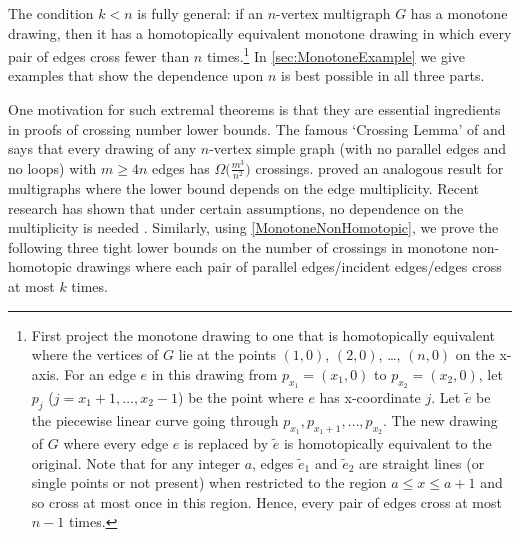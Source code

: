 \documentclass[a4paper,11pt]{article}
\renewcommand{\geq}{\geqslant}
\renewcommand{\leq}{\leqslant}
\begin{document}
The condition $k < n$ is fully general: if an $n$-vertex multigraph $G$ has a monotone drawing, then it has a homotopically equivalent monotone drawing in which every pair of edges cross fewer than $n$ times.\footnote{First project the monotone drawing to one that is homotopically equivalent where the vertices of $G$ lie at the points $(1, 0)$, $(2, 0)$, \ldots, $(n, 0)$ on the x-axis. For an edge $e$ in this drawing from $p_{x_1} = (x_1, 0)$ to $p_{x_2} = (x_2, 0)$, let $p_j$ ($j = x_1 + 1, \dotsc, x_2 - 1$) be the point where $e$ has x-coordinate $j$. Let $\tilde{e}$ be the piecewise linear curve going through $p_{x_1}, p_{x_1 + 1}, \dotsc, p_{x_2}$. The new drawing of $G$ where every edge $e$ is replaced by $\tilde{e}$ is homotopically equivalent to the original. Note that for any integer $a$, edges $\tilde{e}_1$ and $\tilde{e}_2$ are straight lines (or single points or not present) when restricted to the region $a \leq x \leq a + 1$ and so cross at most once in this region. Hence, every pair of edges cross at most $n - 1$ times.} In \cref{sec:MonotoneExample} we give examples that show the dependence upon $n$ is best possible in all three parts.

One motivation for such extremal theorems is that they are essential ingredients in proofs of crossing number lower bounds. The famous `Crossing Lemma' of \citet*{Ajtai82} and \citet{Leighton83} says that every drawing of any $n$-vertex simple graph (with no parallel edges and no loops) with $m \geq 4n$ edges has $\Omega\bigl(\frac{m^3}{n^2}\bigr)$ crossings.  proved an analogous result for multigraphs where the lower bound depends on the edge multiplicity. Recent research has shown that under certain assumptions, no dependence on the multiplicity is needed \citep{KPTU21,PT20,PTT22}. Similarly, using \cref{MonotoneNonHomotopic}, we prove the following three tight lower bounds on the number of crossings in monotone non-homotopic drawings where each pair of parallel edges/incident edges/edges cross at most $k$ times.
\end{document}
